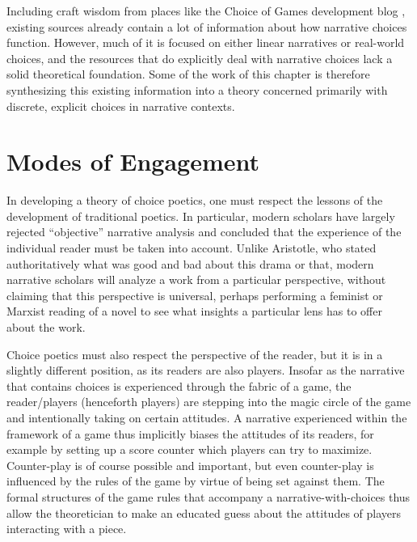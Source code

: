 Including craft wisdom from places like the Choice of Games development blog \citep{ChoiceOfGamesGameDesignCategory}, existing sources already contain a lot of information about how narrative choices function.
%
However, much of it is focused on either linear narratives or real-world choices, and the resources that do explicitly deal with narrative choices lack a solid theoretical foundation.
%
Some of the work of this chapter is therefore synthesizing this existing information into a theory concerned primarily with discrete, explicit choices in narrative contexts.


\section{Modes of Engagement}


In developing a theory of choice poetics, one must respect the lessons of the development of traditional poetics.
%
In particular, modern scholars have largely rejected ``objective'' narrative analysis and concluded that the experience of the individual reader must be taken into account.
%
Unlike Aristotle, who stated authoritatively what was good and bad about this drama or that, modern narrative scholars will analyze a work from a particular perspective, without claiming that this perspective is universal, perhaps performing a feminist or Marxist reading of a novel to see what insights a particular lens has to offer about the work.


Choice poetics must also respect the perspective of the reader, but it is in a slightly different position, as its readers are also players.
%
Insofar as the narrative that contains choices is experienced through the fabric of a game, the reader/players (henceforth players) are stepping into the magic circle of the game \citep{Huizinga1949} and intentionally taking on certain attitudes.
%
A narrative experienced within the framework of a game thus implicitly biases the attitudes of its readers, for example by setting up a score counter which players can try to maximize.
%
Counter-play is of course possible and important, but even counter-play is influenced by the rules of the game by virtue of being set against them.
%
The formal structures of the game rules that accompany a narrative-with-choices thus allow the theoretician to make an educated guess about the attitudes of players interacting with a piece.


